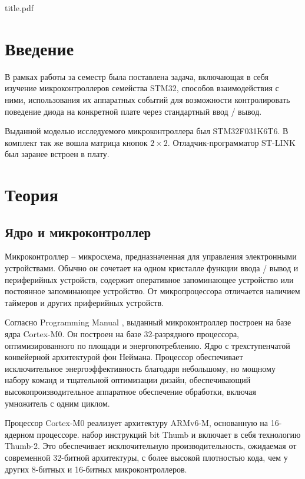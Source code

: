 

\def\oldbibitem{}
\let\oldbibitem=\bibitem
\def\bibitem{\stepcounter{citenum}\oldbibitem}



{title.pdf}

\tableofcontents
\newpage

\section{Введение}
В рамках работы за семестр была поставлена задача, включающая в себя изучение микроконтроллеров семейства STM32,
способов взаимодействия с ними, использования их аппаратных событий для возможности контролировать поведение
диода на конкретной плате через стандартный ввод / вывод. 

Выданной моделью исследуемого микроконтроллера был STM32F031K6T6. В комплект так же вошла матрица кнопок $2\times2$.
Отладчик-программатор ST-LINK был заранее встроен в плату.
\newpage

\section{Теория}
\subsection{Ядро и микроконтроллер}
Микроконтроллер -- микросхема, предназначенная для управления электронными устройствами. Обычно он сочетает на одном 
кристалле функции ввода / вывод и периферийных устройств, содержит оперативное запоминающее устройство или постоянное
запоминающее устройство. От микропроцессора отличается наличием таймеров и других приферийных устройств.

Согласно Programming Manual \cite{prog}, выданный микроконтроллер построен на базе ядра Cortex-M0. Он построен 
на базе 32-разрядного процессора, оптимизированного по площади и энергопотреблению.
Ядро с трехступенчатой конвейерной архитектурой фон Неймана. Процессор обеспечивает исключительное
энергоэффективность благодаря небольшому, но мощному набору команд и тщательной оптимизации
дизайн, обеспечивающий высокопроизводительное аппаратное обеспечение обработки, включая умножитель с одним циклом.

Процессор Cortex-M0 реализует архитектуру ARMv6-M, основанную на 16-ядерном процессоре.
набор инструкций bit Thumb и включает в себя технологию Thumb-2. Это обеспечивает исключительную
производительность, ожидаемая от современной 32-битной архитектуры, с более высокой плотностью кода, чем у других
8-битных и 16-битных микроконтроллеров.

